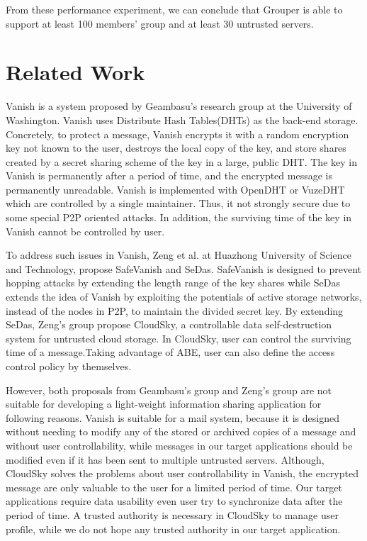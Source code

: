 \documentclass[twocolumn,10pt]{article}
\begin{document}
From these performance experiment, we can conclude that Grouper is able to support at least 100 members' group and at least 30 untrusted servers.

\section{Related Work}

Vanish is a system proposed by Geambasu's research group at the University of Washington. 
Vanish uses Distribute Hash Tables(DHTs) as the back-end storage.
Concretely, to protect a message, Vanish encrypts it with a random encryption key not known to the user, destroys the local copy of the key, and store shares created by a secret sharing scheme of the key in a large, public DHT.
The key in Vanish is permanently after a period of time, and the encrypted message is permanently unreadable.
Vanish is implemented with OpenDHT\cite{rhea2005opendht} or VuzeDHT\cite{vuzedht} which are controlled by a single maintainer. 
Thus, it not strongly secure due to some special P2P oriented attacks\cite{wolchok2010defeating}. 
In addition, the surviving time of the key in Vanish cannot be controlled by user. 

To address such issues in Vanish, Zeng et al. at Huazhong University of Science and Technology, propose SafeVanish and SeDas. 
SafeVanish is designed to prevent hopping attacks by extending the length range of the key shares while SeDas extends the idea of Vanish by exploiting the potentials of active storage networks, instead of the nodes in P2P, to maintain the divided secret key. By extending SeDas, Zeng's group propose CloudSky, a controllable data self-destruction system for untrusted cloud storage. 
In CloudSky, user can control the surviving time of a message.Taking advantage of ABE, user can also define the access control policy by themselves.

However, both proposals from Geambasu's group and Zeng's group are not suitable for developing a light-weight information sharing application for following reasons. 
Vanish is suitable for a mail system, because it is designed without needing to modify any of the stored or archived copies of a message and without user controllability, while messages in our target applications should be modified even if it has been sent to multiple untrusted servers.  
Although, CloudSky solves the problems about user controllability in Vanish, the encrypted message are only valuable to the user for a limited period of time.
Our target applications require data usability even user try to synchronize data after the period of time. 
A trusted authority is necessary in CloudSky to manage user profile, while we do not hope any trusted authority in our target application.
\end{document}
